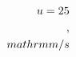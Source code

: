\documentclass[preview]{standalone}
\begin{document}
\begin{align*}
\special{dvisvgm:raw <g id='unique000'>}u = 25\\,\\mathrm{m/s}\special{dvisvgm:raw </g>}
\end{align*}
\end{document}
